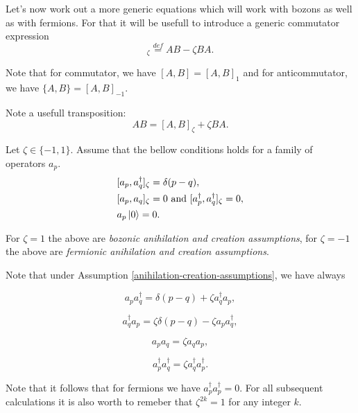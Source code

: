 \documentclass[main.tex]{subfiles}
\begin{document}
Let's now work out a more generic equations which will work with bozons as well as with fermions. For that it will be usefull to introduce a generic commutator expression
\begin{equation}
[A, B]_{\zeta} \stackrel{def}{=} AB -\zeta BA.
\end{equation}

Note that for commutator, we have $[A, B] = [A, B]_1$ and for anticommutator, we have $\{A, B\} = [A, B]_{-1}$.

Note a usefull transposition:
\begin{equation}
AB = [A, B]_{\zeta} + \zeta BA.
\end{equation}

\begin{assumption}
\label{anihilation-creation-assumptions}
Let $\zeta\in\{-1, 1\}$. Assume that the bellow conditions holds for a family of operators $a_p$.
\begin{align}
& [a_p, a^\dagger_q]_\zeta = \delta(p - q),\\
& [a_p, a_q]_\zeta = 0 \text{ and } [a^\dagger_p, a^\dagger_q]_\zeta = 0,\\
& a_p\ket{0} = 0.
\end{align}
\end{assumption}

For $\zeta = 1$ the above are \textit{bozonic anihilation and creation assumptions}, for $\zeta = -1$ the above are \textit{fermionic anihilation and creation assumptions}.

Note that under Assumption \ref{anihilation-creation-assumptions}, we have always

\begin{equation}
a_p a_{q}^\dagger = \delta(p - q) + \zeta a_{q}^\dagger a_p,
\end{equation}

\begin{equation}
a_{q}^\dagger a_p = \zeta \delta(p - q) - \zeta a_p a_{q}^\dagger,
\end{equation}

\begin{equation}
a_p a_q = \zeta a_q a_p,
\end{equation}

\begin{equation}
a^\dagger_p a^\dagger_q = \zeta a^\dagger_q a^\dagger_p.
\end{equation}  

Note that it follows that for fermions we have $a^\dagger_p a^\dagger_p = 0$. For all subsequent calculations it is also worth to remeber that $\zeta^{2k} = 1$ for any integer $k$.
\end{document}

